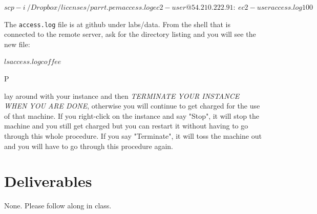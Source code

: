 \documentclass[titlepage]{tufte-book}
\newcounter{problem}
\newcommand{\step}[1]{{}
\vspace{4pt} \noindent {\bf \theproblem. }#1\addtocounter{problem}{1}}
\begin{document}
\begin{fullwidth}
{\small
\begin{alltt}
$ scp -i ~/Dropbox/licenses/parrt.pem access.log ec2-user@54.210.222.91:~ec2-user
access.log                                    100%
$ 
\end{alltt}
}

 The {\tt access.log} file is at github under labs/data.  From the shell that is connected to the remote server, ask for the directory listing and you will see the new file:

{\small
\begin{alltt}
$ ls
access.log  coffee
$ 
\end{alltt}
}

\step Play around with your instance and then {\em TERMINATE YOUR INSTANCE WHEN YOU ARE DONE}, otherwise you will continue to get charged for the use of that machine. If you right-click on the instance and say "Stop", it will stop the machine and you still get charged but you can restart it without having to go through this whole procedure. If you say "Terminate", it will toss the machine out and you will have to go through this procedure again.

\section{Deliverables}

None. Please follow along in class.

\end{fullwidth}
\end{document}
